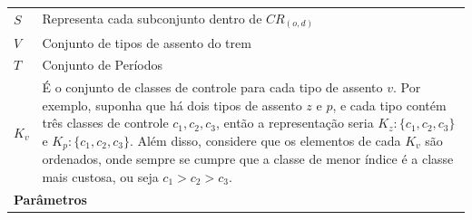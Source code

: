 \begin{table}[H]
\begin{tabular}{p{2cm} p{9.5cm} p{3.2cm}}
		$S$                & Representa cada subconjunto dentro de $CR_{(o,d)}$                                                                                                                                                                                                                                                                                                                                                                          &                                              \\
		$V$                & Conjunto de tipos de assento do trem                                                                                                                                                                                                                                                                                                                                                                                                 &                                              \\
		$T$                & Conjunto de Períodos                                                                                                                                                                                                                                                                                                                                                                                           &                                              \\
		$K_v$              & \multicolumn{2}{p{12.7cm}}{É o conjunto de classes de controle para cada tipo de assento $v$. Por exemplo, suponha que há dois tipos de assento $z$ e $p$, e cada tipo contém três classes de controle $c_1, c_2, c_3$, então a representação seria $K_z:\{c_1,c_2,c_3\}$ e $K_p:\{c_1,c_2,c_3\}$. Além disso, considere que os elementos de cada $K_v$ são ordenados, onde sempre se cumpre que a classe de menor índice é a classe mais custosa, ou seja $c_1>c_2>c_3$.}                    \\ \midrule
		\multicolumn{3}{l}{\textbf{Parâmetros}}                                                                                                                                                                                                                                                                                                                                                                                                                                                           \\ \midrule

\end{tabular}
\end{table}
